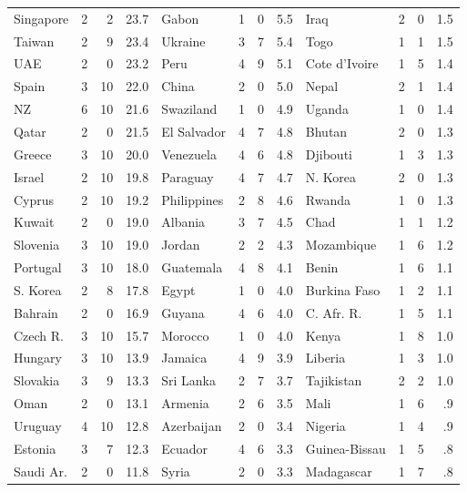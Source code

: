 \begin{table}
\begin{table}
\begin{tabular}{|lrrr|lrrr|lrrr|}
Singapore     & 2 &  2 &23.7 &Gabon         & 1 &  0 & 5.5&Iraq         &2& 0&  1.5\\
Taiwan        & 2 &  9 &23.4 &Ukraine       & 3 &  7 & 5.4&Togo         &1& 1&  1.5\\
UAE           & 2 &  0 &23.2 &Peru          & 4 &  9 & 5.1&Cote d'Ivoire&1& 5&  1.4\\
Spain         & 3 & 10 &22.0 &China         & 2 &  0 & 5.0&Nepal        &2& 1&  1.4\\
NZ            & 6 & 10 &21.6 &Swaziland     & 1 &  0 & 4.9&Uganda       &1& 0&  1.4\\
Qatar         & 2 &  0 &21.5 &El Salvador   & 4 &  7 & 4.8&Bhutan       &2& 0&  1.3\\
Greece        & 3 & 10 &20.0 &Venezuela     & 4 &  6 & 4.8&Djibouti     &1& 3&  1.3\\
Israel        & 2 & 10 &19.8 &Paraguay      & 4 &  7 & 4.7&N. Korea     &2& 0&  1.3\\
Cyprus        & 2 & 10 &19.2 &Philippines   & 2 &  8 & 4.6&Rwanda       &1& 0&  1.3\\
Kuwait        & 2 &  0 &19.0 &Albania       & 3 &  7 & 4.5&Chad         &1& 1&  1.2\\
Slovenia      & 3 & 10 &19.0 &Jordan        & 2 &  2 & 4.3&Mozambique   &1& 6&  1.2\\
Portugal      & 3 & 10 &18.0 &Guatemala     & 4 &  8 & 4.1&Benin        &1& 6&  1.1\\
S. Korea      & 2 &  8 &17.8 &Egypt         & 1 &  0 & 4.0&Burkina Faso &1& 2&  1.1\\
Bahrain       & 2 &  0 &16.9 &Guyana        & 4 &  6 & 4.0&C. Afr. R.   &1& 5&  1.1\\
Czech R.      & 3 & 10 &15.7 &Morocco       & 1 &  0 & 4.0&Kenya        &1& 8&  1.0\\
Hungary       & 3 & 10 &13.9 &Jamaica       & 4 &  9 & 3.9&Liberia      &1& 3&  1.0\\
Slovakia      & 3 &  9 &13.3 &Sri Lanka     & 2 &  7 & 3.7&Tajikistan   &2& 2&  1.0\\
Oman          & 2 &  0 &13.1 &Armenia       & 2 &  6 & 3.5&Mali         &1& 6&   .9\\
Uruguay       & 4 & 10 &12.8 &Azerbaijan    & 2 &  0 & 3.4&Nigeria      &1& 4&   .9\\
Estonia       & 3 &  7 &12.3 &Ecuador       & 4 &  6 & 3.3&Guinea-Bissau&1& 5&   .8\\
Saudi Ar.     & 2 &  0 &11.8 &Syria         & 2 &  0 & 3.3&Madagascar   &1& 7&   .8\\

\end{tabular}
\end{table}
\end{table}

